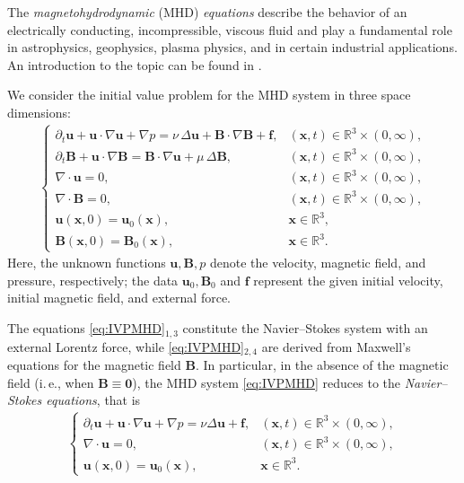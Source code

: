 \documentclass[10pt]{amsart}
\theoremstyle{plain}
\theoremstyle{definition}
\theoremstyle{remark}
\numberwithin{equation}{section}
\newcommand{\pt}{\partial_t}
\newcommand{\bx}{\boldsymbol{x}}
\newcommand{\bu}{{\boldsymbol{u}}}
\newcommand{\bB}{{\boldsymbol{B}}}
\newcommand{\Bf}{{\boldsymbol{f}}}
\begin{document}
The \textit{magnetohydrodynamic} (MHD) \textit{equations} describe the behavior of an electrically conducting, incompressible, viscous fluid and play a fundamental role in astrophysics, geophysics, plasma physics, and in certain industrial applications. An introduction to the topic can be found in \cite{Davidson_Book_2nd_2017}.

We consider the initial value problem for the MHD system in three space dimensions: 
\begin{align}\label{eq:IVPMHD}
\begin{cases}
\pt\bu + \bu \cdot \nabla \bu + \nabla p = \nu\, \Delta \bu + \bB \cdot \nabla \bB+\Bf, &  (\bx,t) \in \mathbb{R}^3\times(0,\infty), \\
\pt\bB + \bu \cdot \nabla \bB =  \bB \cdot \nabla \bu + \mu\, \Delta \bB, &  (\bx,t) \in \mathbb{R}^3\times(0,\infty), \\
\nabla \cdot \bu = 0, &  (\bx,t) \in \mathbb{R}^3\times(0,\infty), \\
\nabla \cdot \bB = 0, &  (\bx,t) \in \mathbb{R}^3\times(0,\infty), \\
\bu(\bx,0)=\bu_0(\bx), &  \bx \in \mathbb{R}^3,\\
\bB(\bx,0)=\bB_0(\bx), &  \bx \in \mathbb{R}^3.
\end{cases}
\end{align}
Here, the unknown functions $\bu,\bB,p$ denote the velocity, magnetic field, and pressure, respectively; the data $\bu_0,\bB_0$ and $\Bf$ represent the given initial velocity, initial magnetic field, and external force. 

The equations \cref{eq:IVPMHD}$_{1,3}$ constitute the Navier--Stokes system with an external Lorentz force, while \cref{eq:IVPMHD}$_{2,4}$ are derived from Maxwell's equations for the magnetic field $\boldsymbol{B}$. In particular, in the absence of the magnetic field (i.\,e., when $\boldsymbol{B} \equiv \boldsymbol{0}$), the MHD system \cref{eq:IVPMHD} reduces to the \emph{Navier--Stokes equations}, that is 
\begin{align}\label{eq:IVPNSE}
\begin{cases}
\pt\bu + \bu \cdot \nabla \bu + \nabla p =\nu \Delta \bu +\Bf, &  (\bx,t) \in \mathbb{R}^3\times(0,\infty), \\
\nabla \cdot \bu = 0, &  (\bx,t) \in \mathbb{R}^3\times(0,\infty), \\
\bu(\bx,0)=\bu_0(\bx), &  \bx \in \mathbb{R}^3.
\end{cases}
\end{align}
\end{document}
